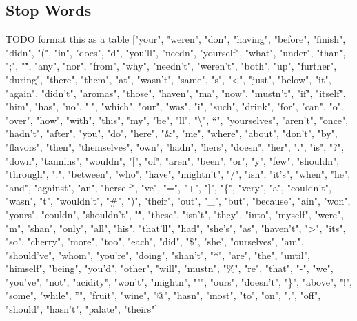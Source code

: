 \documentclass[10pt]{IEEEtran}
\begin{document}
\subsection{Stop Words}
TODO format this as a table
["your", "weren", "don", "having", "before", "finish", "didn", "(", "in", "does", "d", "you'll", "needn", "yourself", "what", "under", "than", ";", "\~", "any", "nor", "from", "why", "needn't", "weren't", "both", "up", "further", "during", "there", "them", "at", "wasn't", "same", "s", "<", "just", "below", "it", "again", "didn't", "aromas", "those", "haven", "ma", "now", "mustn't", "if", "itself", "him", "has", "no", "|", "which", "our", "was", "i", "such", "drink", "for", "can", "o", "over", "how", "with", "this", "my", "be", "ll", "\textbackslash", "`", "yourselves", "aren't", "once", "hadn't", "after", "you", "do", "here", "\&", "me", "where", "about", "don't", "by", "flavors", "then", "themselves", "own", "hadn", "hers", "doesn", "her", ".", "is", "?", "down", "tannins", "wouldn", "[", "of", "aren", "been", "or", "y", "few", "shouldn", "through", ":", "between", "who", "have", "mightn't", "/", "isn", "it's", "when", "he", "and", "against", "an", "herself", "ve", "=", "+", "]", "\{", "very", "a", "couldn't", "wasn", "t", "wouldn't", "\#", ")", "their", "out", "\_", "but", "because", "ain", "won", "yours", "couldn", "shouldn't", "\^", "these", "isn't", "they", "into", "myself", "were", "m", "shan", "only", "all", "his", "that'll", "had", "she's", "as", "haven't", ">", "its", "so", "cherry", "more", "too", "each", "did", "\$", "she", "ourselves", "am", "should've", "whom", "you're", "doing", "shan't", "*", "are", "the", "until", "himself", "being", "you'd", "other", "will", "mustn", "\%", "re", "that", "-", "we", "you've", "not", "acidity", "won't", "mightn", """, "ours", "doesn't", "\}", "above", "!", "some", "while", "'", "fruit", "wine", "@", "hasn", "most", "to", "on", ",", "off", "should", "hasn't", "palate", "theirs"]
\end{document}
